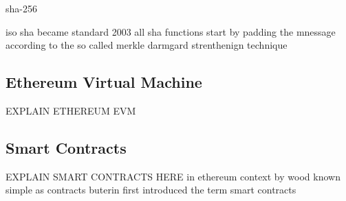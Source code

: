 \cite{van2014encyclopedia} sha-256

\cite{isoSHA-256} iso sha became standard 2003 %
\cite{coron2005merkle} all sha functions start by padding the mnessage according to the so called merkle darmgard strenthenign technique
\cite{nakamoto2008peer}
\cite{back2002hashcash}

\subsection{Ethereum Virtual Machine}
\label{subsec:background:first_section:ethereum}
EXPLAIN ETHEREUM \ac{EVM}

\cite{dannen2017introducing}
\cite{wood2014ethereum}

\subsection{Smart Contracts}
\label{subsec:background:first_section:first_subsection}
EXPLAIN SMART CONTRACTS HERE 
in ethereum context by wood known simple as contracts
buterin first introduced the term smart contracts
\cite{buterin2013ethereum}
\cite{wood2014ethereum}
\cite{dannen2017introducing}





